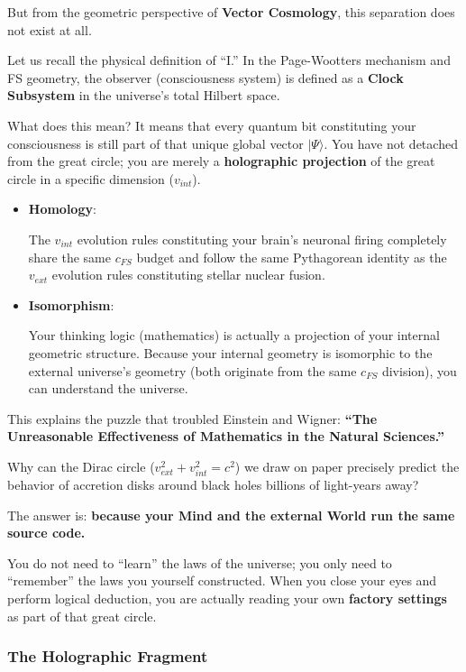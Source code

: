 But from the geometric perspective of \textbf{Vector Cosmology}, this separation does not exist at all.

Let us recall the physical definition of ``I.'' In the Page-Wootters mechanism and FS geometry, the observer (consciousness system) is defined as a \textbf{Clock Subsystem} in the universe's total Hilbert space.

What does this mean? It means that every quantum bit constituting your consciousness is still part of that unique global vector $|\Psi\rangle$. You have not detached from the great circle; you are merely a \textbf{holographic projection} of the great circle in a specific dimension ($v_{int}$).

\begin{itemize}
\item \textbf{Homology}:

    The $v_{int}$ evolution rules constituting your brain's neuronal firing completely share the same $c_{FS}$ budget and follow the same Pythagorean identity as the $v_{ext}$ evolution rules constituting stellar nuclear fusion.

\item \textbf{Isomorphism}:

    Your thinking logic (mathematics) is actually a projection of your internal geometric structure. Because your internal geometry is isomorphic to the external universe's geometry (both originate from the same $c_{FS}$ division), you can understand the universe.
\end{itemize}

This explains the puzzle that troubled Einstein and Wigner: \textbf{``The Unreasonable Effectiveness of Mathematics in the Natural Sciences.''}

Why can the Dirac circle ($v_{ext}^2 + v_{int}^2 = c^2$) we draw on paper precisely predict the behavior of accretion disks around black holes billions of light-years away?

The answer is: \textbf{because your Mind and the external World run the same source code.}

You do not need to ``learn'' the laws of the universe; you only need to ``remember'' the laws you yourself constructed. When you close your eyes and perform logical deduction, you are actually reading your own \textbf{factory settings} as part of that great circle.

\subsubsection{The Holographic Fragment}

